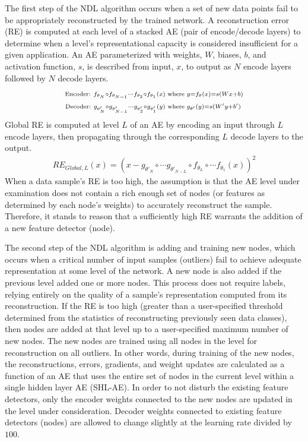 \documentclass[10pt,conference]{IEEEtran}
\begin{document}
The first step of the NDL algorithm occurs when a set of new data points fail to be appropriately reconstructed by the trained network. A reconstruction error (RE) is computed at each level of a stacked AE (pair of encode/decode layers) to determine when a level's representational capacity is considered insufficient for a given application. An AE parameterized with weights, $W$, biases, $b$, and activation function, $s$, is described from input, $x$, to output as $N$ encode layers followed by $N$ decode layers.
\begin{align}
\scriptstyle \text{Encoder: }  f_{\theta_N} \circ f_{\theta_{N-1}} \cdots f_{\theta_2} \circ f_{\theta_1}(x) \text{ where }& \scriptstyle y = f_\theta(x) = s(Wx + b)\\
\scriptsize \text{Decoder: } \scriptstyle g_{\theta'_N} \circ g_{\theta'_{N-1}} \cdots g_{\theta'_2} \circ g_{\theta'_1}(y) \text{ where }& \scriptstyle g_{\theta'}(y) = s(W'y + b') \label{eq2}
\end{align}
Global RE is computed at level $L$ of an AE by encoding an input through $L$ encode layers, then propagating through the corresponding $L$ decode layers to the output. 
\begin{align}
\scriptstyle RE_{Global, L} (x) = (x - g_{\theta'_N} \circ \cdots g_{\theta'_{N-L}} \circ f_{\theta_L} \circ \cdots f_{\theta_1}(x))^2
\end{align}
When a data sample's RE is too high, the assumption is that the AE level under examination does not contain a rich enough set of nodes (or features as determined by each node's weights) to accurately reconstruct the sample. Therefore, it stands to reason that a sufficiently high RE warrants the addition of a new feature detector (node).

The second step of the NDL algorithm is adding and training new nodes, which occurs when a critical number of input samples (outliers) fail to achieve adequate representation at some level of the network. A new node is also added if the previous level added one or more nodes. This process does not require labels, relying entirely on the quality of a sample's representation computed from its reconstruction. If the RE is too high (greater than a user-specified threshold determined from the statistics of reconstructing previously seen data classes), then nodes are added at that level up to a user-specified maximum number of new nodes. The new nodes are trained using all nodes in the level for reconstruction on all outliers. In other words, during training of the new nodes, the reconstructions, errors, gradients, and weight updates are calculated as a function of an AE that uses the entire set of nodes in the current level within a single hidden layer AE (SHL-AE). In order to not disturb the existing feature detectors, only the encoder weights connected to the new nodes are updated in the level under consideration. Decoder weights connected to existing feature detectors (nodes) are allowed to change slightly at the learning rate divided by $100$.
\end{document}
